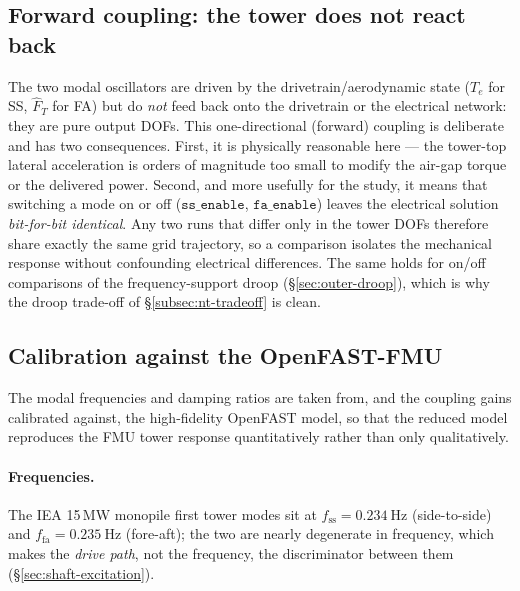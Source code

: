 \subsection{Forward coupling: the tower does not react back}
\label{subsec:stm-forward}

The two modal oscillators are driven by the drivetrain/aerodynamic state
(\(T_e\) for SS, \(\hat{F}_T\) for FA) but do \emph{not} feed back onto the
drivetrain or the electrical network: they are pure output DOFs. This
one-directional (forward) coupling is deliberate and has two consequences. First,
it is physically reasonable here --- the tower-top lateral acceleration is orders
of magnitude too small to modify the air-gap torque or the delivered power.
Second, and more usefully for the study, it means that switching a mode on or off
(\(\texttt{ss\_enable}\), \(\texttt{fa\_enable}\)) leaves the electrical solution
\emph{bit-for-bit identical}. Any two runs that differ only in the tower DOFs
therefore share exactly the same grid trajectory, so a comparison isolates the
mechanical response without confounding electrical differences. The same holds
for on/off comparisons of the frequency-support droop (\S\ref{sec:outer-droop}),
which is why the droop trade-off of \S\ref{subsec:nt-tradeoff} is clean.

\subsection{Calibration against the OpenFAST-FMU}
\label{subsec:stm-calibration}

The modal frequencies and damping ratios are taken from, and the coupling gains
calibrated against, the high-fidelity OpenFAST model, so that the reduced model
reproduces the FMU tower response quantitatively rather than only qualitatively.

\paragraph{Frequencies.}
The IEA 15\,MW monopile first tower modes sit at
\(f_{\mathrm{ss}} = \SI{0.234}{\hertz}\) (side-to-side) and
\(f_{\mathrm{fa}} = \SI{0.235}{\hertz}\) (fore-aft); the two are nearly
degenerate in frequency, which makes the \emph{drive path}, not the frequency,
the discriminator between them (\S\ref{sec:shaft-excitation}).

